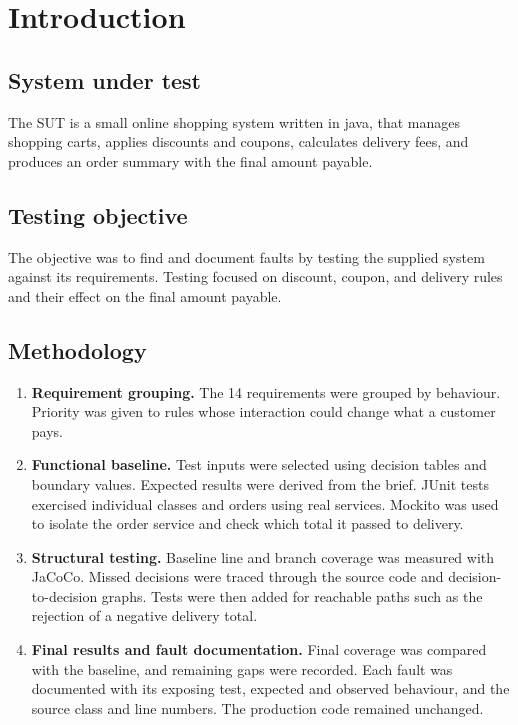 \chapter{Introduction}
\label{chap:introduction}

\section{System under test}
The SUT is a small online shopping system written in java, that manages shopping carts, applies discounts and coupons, calculates delivery fees, and produces an order summary with the final amount payable.

\section{Testing objective}
The objective was to find and document faults by testing the supplied
system against its requirements. Testing focused on discount, coupon,
and delivery rules and their effect on the final amount payable.

\section{Methodology}
\begin{enumerate}
    \item \textbf{Requirement grouping.} The 14 requirements were
    grouped by behaviour. Priority was given to rules whose interaction
    could change what a customer pays.
    \item \textbf{Functional baseline.} Test inputs were selected using
    decision tables and boundary values. Expected results were derived
    from the brief. JUnit tests exercised individual classes and orders
    using real services. Mockito was used to isolate the order service
    and check which total it passed to delivery.
    \item \textbf{Structural testing.} Baseline line and branch coverage
    was measured with JaCoCo. Missed decisions were traced through the
    source code and decision-to-decision graphs. Tests were then added
    for reachable paths such as the rejection of a negative delivery total.
    \item \textbf{Final results and fault documentation.} Final coverage
    was compared with the baseline, and remaining gaps were recorded.
    Each fault was documented with its exposing test, expected and
    observed behaviour, and the source class and line numbers. The
    production code remained unchanged.
\end{enumerate}

